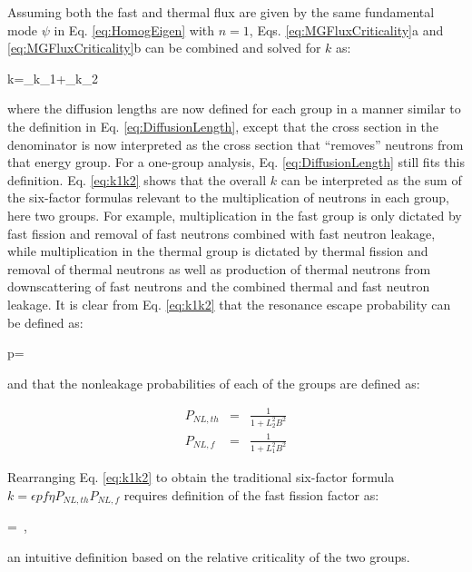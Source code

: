 Assuming both the fast and thermal flux are given by the same fundamental mode \(\psi\) in Eq. \eqref{eq:HomogEigen} with \(n=1\), Eqs. \eqref{eq:MGFluxCriticality}a and \eqref{eq:MGFluxCriticality}b can be combined and solved for \(k\) as:

\beq
\label{eq:k1k2}
k=_{k_1}+_{k_2}
\eeq

where the diffusion lengths are now defined for each group in a manner similar to the definition in Eq. \eqref{eq:DiffusionLength}, except that the cross section in the denominator is now interpreted as the cross section that ``removes'' neutrons from that energy group. For a one-group analysis, Eq. \eqref{eq:DiffusionLength} still fits this definition. Eq. \eqref{eq:k1k2} shows that the overall \(k\) can be interpreted as the sum of the six-factor formulas relevant to the multiplication of neutrons in each group, here two groups. For example, multiplication in the fast group is only dictated by fast fission and removal of fast neutrons combined with fast neutron leakage, while multiplication in the thermal group is dictated by thermal fission and removal of thermal neutrons as well as production of thermal neutrons from downscattering of fast neutrons and the combined thermal and fast neutron leakage. It is clear from Eq. \eqref{eq:k1k2} that the resonance escape probability can be defined as:

\beq
p=
\eeq

and that the nonleakage probabilities of each of the groups are defined as:

\begin{subequations}
\begin{eqnarray}
P_{NL,th}&=&\frac{1}{1+L_2^2B^2}\\
P_{NL,f}&=&\frac{1}{1+L_1^2B^2}
\end{eqnarray}
\end{subequations}

Rearranging Eq. \eqref{eq:k1k2} to obtain the traditional six-factor formula \(k=\epsilon pf\eta P_{NL,th}P_{NL,f}\) requires definition of the fast fission factor as:

\beq
\epsilon=\ ,
\eeq

an intuitive definition based on the relative criticality of the two groups.

